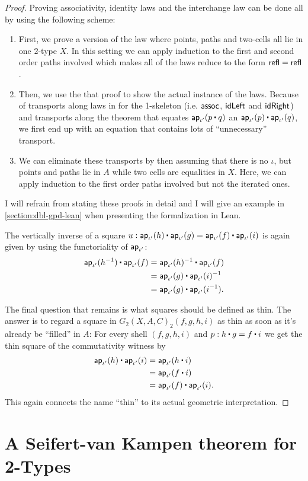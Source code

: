 \begin{proof}
Proving associativity, identity laws and the interchange law can be done all by
using the following scheme:
\begin{enumerate}
\item First, we prove a version of the law where points, paths and two-cells
all lie in one 2-type $X$.
In this setting we can apply induction to the first and second order paths involved
which makes all of the laws reduce to the form $\mathsf{refl} = \mathsf{refl}$.
\item Then, we use the that proof to show the actual instance of the laws.
Because of transports along laws in for the 1-skeleton 
(i.e. $\mathsf{assoc}$, $\mathsf{idLeft}$ and $\mathsf{idRight}$) and transports along the theorem that
equates $\apiop(p \ct q)$ an $\apiop(p) \ct \apiop(q)$, we first end up with an
equation that contains lots of ``unnecessary'' transport. 
\item We can eliminate these
transports by then assuming that there is no $\iota$, but points and paths
lie in $A$ while two cells are equalities in $X$.
Here, we can apply induction to the first order paths involved but not the iterated ones.
\end{enumerate}
I will refrain from stating these proofs in detail and I will give an example in
\ref{section:dbl-gpd-lean} when presenting the formalization in Lean. %

The vertically inverse of a square $u : \apiop(h) \ct \apiop(g) 
= \apiop(f) \ct \apiop(i)$ is again given by using the functoriality
of $\mathsf{ap}_{\iota'}$:
\begin{align*}
\apiop(h\inv) \ct \apiop(f) &= \apiop(h)\inv \ct \apiop(f) \\
	&= \apiop(g) \ct \apiop(i)\inv \\
	&= \apiop(g) \ct \apiop(i\inv) \text{.} \\	
\end{align*}

The final question that remains is what squares should be defined as thin.
The answer is to regard a square in $G_2(X,A,C)_2(f,g,h,i)$ as thin as soon as
it's already be ``filled''
in $A$: For every shell $(f,g,h,i)$ and $p : h \ct g = f \ct i$ we get the thin
square of the commutativity witness by
\begin{align*}
\apiop(h) \ct \apiop(i) &= \apiop(h \ct i) \\
	&= \apiop(f \ct i) \\
	&= \apiop(f) \ct \apiop(i) \text{.}
\end{align*}
This again connects the name ``thin'' to its actual geometric interpretation.
\end{proof}

\section{A Seifert-van Kampen theorem for 2-Types}

